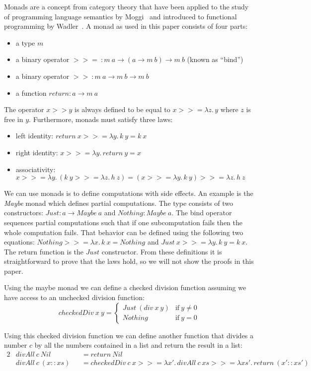 \documentclass[a4paper,UKenglish,cleveref, autoref, thm-restate, anonymous]{oasics-v2021}
\newcommand\bind[1]{>\!\!>\!\!= \lambda #1.\,}
\newcommand\then{>\!\!>}
\begin{document}
Monads are a concept from category theory that have been applied to the study of programming language semantics by Moggi~\cite{39155} and introduced to functional programming by Wadler~\cite{10.1145/91556.91592}.
A monad as used in this paper consists of four parts: 
\begin{itemize}
  \item a type $m$
  \item a binary operator $>\!\!>\!\!=~: m~a \to (a \to m~b) \to m~b$ (known as ``bind'')
  \item a binary operator $\then~: m~a \to m~b \to m~b$
  \item a function $\mathit{return} : a \to m~a$
\end{itemize}
The operator $x \then y$ is always defined to be equal to $x \bind{z} y$ where $z$ is free in $y$.
Furthermore, monads must satisfy three laws:
\begin{itemize}
  \item left identity: $return~x \bind{y} k~y = k~x$
  \item right identity: $x \bind{y} return~y = x$
  \item associativity: $x \bind{y} (k~y \bind{z} h~z) = (x \bind{y} k~y) \bind{z} h~z$
\end{itemize}

We can use monads is to define computations with side effects.
An example is the \textit{Maybe} monad which defines partial computations.
The type consists of two constructors: $\mathit{Just}: a \to \mathit{Maybe}~a$ and $\mathit{Nothing} : \mathit{Maybe}~a$.
The bind operator sequences partial computations such that if one subcomputation fails then the whole computation fails.
That behavior can be defined using the following two equations: $\mathit{Nothing} \bind{x} k~x = \mathit{Nothing}$ and $\mathit{Just}~x \bind{y} k~y = k~x$.
The return function is the $\mathit{Just}$ constructor.
From these definitions it is straightforward to prove that the laws hold, so we will not show the proofs in this paper.

Using the maybe monad we can define a checked division function assuming we have access to an unchecked division function: 
\[
  \mathit{checkedDiv}~x~y = \begin{cases} 
    \mathit{Just}~(\mathit{div}~x~y) & \text{if}~y \neq 0 \\
    \mathit{Nothing} & \text{if}~y = 0
  \end{cases}
\]

Using this checked division function we can define another function that divides a number $c$ by all the numbers contained in a list and return the result in a list:
\begin{alignat*}{2}
  & \mathit{divAll}~c~\mathit{Nil} && = \mathit{return}~\mathit{Nil} \\
  & \mathit{divAll}~c~(x :: xs) && = 
    \mathit{checkedDiv}~c~x \bind{x'}
    \mathit{divAll}~c~xs \bind{xs'}
    \mathit{return}~(x' :: xs')
\end{alignat*}
\end{document}
